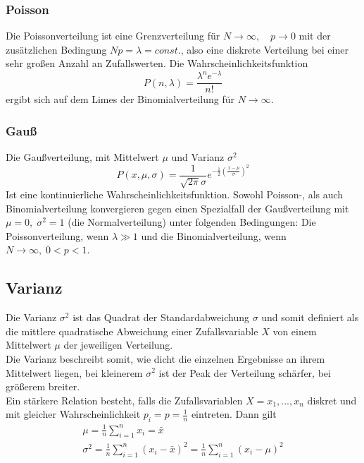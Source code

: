 \documentclass{article}
\begin{document}
	\subsubsection{Poisson}
	Die Poissonverteilung ist eine Grenzverteilung für $N \rightarrow\infty,\quad p\rightarrow0$ mit der zusätzlichen Bedingung $Np=\lambda=const.$, also eine diskrete Verteilung bei einer sehr großen Anzahl an Zufallswerten. Die Wahrscheinlichkeitsfunktion
	\begin{equation}
	P(n,\lambda)=\frac{\lambda^n e^{-\lambda}}{n!}
	\end{equation}
	ergibt sich auf dem Limes der Binomialverteilung für $N\rightarrow\infty$.
	\subsubsection{Gauß}
	Die Gaußverteilung, mit Mittelwert $\mu$ und Varianz $\sigma^2$ 
	\begin{equation}
	P(x,\mu,\sigma)=\frac{1}{\sqrt{2\pi}\sigma}e^{-\frac{1}{2}\left(\frac{x-\mu}{\sigma}\right)^2}
	\end{equation}
	Ist eine kontinuierliche Wahrscheinlichkeitsfunktion. Sowohl Poisson-, als auch Binomialverteilung konvergieren gegen einen Spezialfall der Gaußverteilung mit $\mu=0,\;\sigma^2=1$ (die Normalverteilung) unter folgenden Bedingungen: Die Poissonverteilung, wenn $\lambda\gg1$ und die Binomialverteilung, wenn $N\rightarrow\infty,\;0<p<1$.
	\subsection{Varianz}
	Die Varianz $\sigma^2$ ist das Quadrat der Standardabweichung $\sigma$ und somit definiert als die mittlere quadratische Abweichung einer Zufallsvariable $X$ von einem Mittelwert $\mu$ der jeweiligen Verteilung.\\
	Die Varianz beschreibt somit, wie dicht die einzelnen Ergebnisse an ihrem Mittelwert liegen, bei kleinerem $\sigma^2$ ist der Peak der Verteilung schärfer, bei größerem breiter.\\
	Ein stärkere Relation besteht, falls die Zufallsvariablen $X={x_1,...,x_n}$ diskret und mit gleicher Wahrscheinlichkeit $p_i=p=\frac{1}{n}$ eintreten. Dann gilt
	\begin{gather}
	\mu=\frac{1}{n}\sum_{i=1}^{n}x_i=\bar{x}\\
	\sigma^2=\frac{1}{n}\sum_{i=1}^{n}(x_i-\bar{x})^2=\frac{1}{n}\sum_{i=1}^{n}(x_i-\mu)^2
	\end{gather} 
\end{document}

